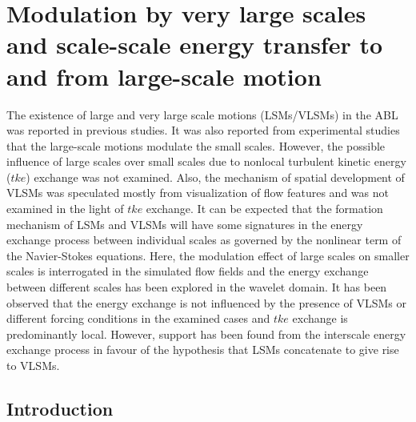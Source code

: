 
\chapter{Modulation by very large scales and scale-scale energy transfer to and from large-scale motion}\label{chap:chap2}
The existence of large and very large scale motions (LSMs/VLSMs) in the ABL was reported in previous studies. It was also reported from experimental studies that the large-scale motions modulate the small scales. However, the possible influence of large scales over small scales due to nonlocal turbulent kinetic energy ($tke$) exchange was not examined. Also, the mechanism of spatial development of VLSMs was speculated mostly from visualization of flow features and was not examined in the light of $tke$ exchange. It can be expected that the formation mechanism of LSMs and VLSMs will have some signatures in the energy exchange process between individual scales as governed by the nonlinear term of the Navier-Stokes equations. Here, the modulation effect of large scales on smaller scales is interrogated in the simulated flow fields and the energy exchange between different scales has been explored in the wavelet domain. It has been observed that the energy exchange is not influenced by the presence of VLSMs or different forcing conditions in the examined cases and $tke$ exchange is predominantly local. However, support has been found from the interscale energy exchange process in favour of the hypothesis that LSMs concatenate to give rise to VLSMs.


\section{Introduction}

